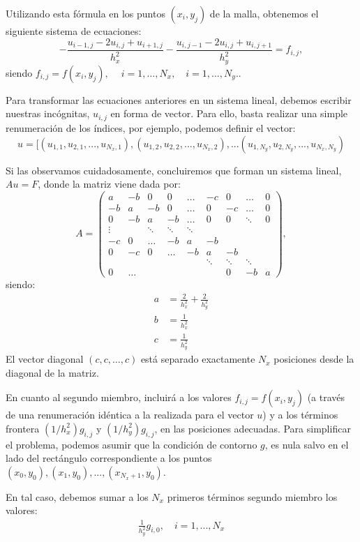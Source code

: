 \documentclass[11pt,spanish,a4wide]{article}
\begin{document}
Utilizando esta fórmula en los puntos $(x_i,y_j)$ de la malla,
obtenemos el siguiente sistema de ecuaciones:
$$
-\frac{u_{i-1,j}-2u_{i,j} + u_{i+1,j}}{h_x^2}
-\frac{u_{i,j-1}-2u_{i,j} + u_{i,j+1}}{h_y^2}
= f_{i,j},
$$
siendo $f_{i,j}=f(x_{i},y_j), \  \quad i=1,\dots,N_x,  \quad i=1,\dots,N_y.$.

Para transformar las ecuaciones anteriores en un sistema lineal,
debemos escribir nuestras incógnitas, $u_{i,j}$ en forma de
vector. Para ello, basta realizar una simple renumeración de los
índices, por ejemplo, podemos definir el vector:
$$
u=[(u_{1,1}, u_{2,1},...,u_{N_x,1}), (u_{1,2}, u_{2,2},...,u_{N_x,2}),
...
(u_{1,N_y}, u_{2,N_y},...,u_{N_x,N_y})
$$


Si las observamos cuidadosamente, concluiremos que forman un sistema
lineal, $Au=F$, donde la matriz viene dada por:
$$
A=
\begin{pmatrix}
   a & -b &  0 &  0 & \dots & -c & 0 & \dots & 0 \\
  -b &  a & -b &  0 & \dots & 0 & -c & \dots & 0\\
   0 & -b &  a & -b & \dots & 0 & 0 & \ddots & 0 \\
   \vdots &    & \ddots & \ddots & \ddots & \\
   -c & 0 & \dots & -b & a  & -b \\
   0 & -c &  0 & \dots & -b & a  & -b \\
     & & &&    & \ddots & \ddots & \ddots & \\
   0 & \dots & &  & & & 0 & -b & a
 \end{pmatrix},
$$
siendo:
\begin{align*}
  a&=\frac{2}{h_x^2}+\frac{2}{h_y^2} \\
  b&=\frac{1}{h_x^2} \\
  c&=\frac{1}{h_y^2}
\end{align*}
El vector diagonal $(c,c,\dots,c)$ está separado exactamente $N_x$
posiciones desde la diagonal de la matriz.

En cuanto al segundo miembro, incluirá a los valores
$f_{i,j}=f(x_i,y_j)$ (a través de una renumeración idéntica a la
realizada para el vector $u$) y a los términos frontera
$(1/h_x^2)g_{i,j}$ y $(1/h_y^2)g_{i,j}$, en las posiciones adecuadas.
Para simplificar el problema, podemos asumir que la condición de
contorno $g$, es nula salvo en el lado del rectángulo correspondiente
a los puntos $(x_0,y_0), (x_1,y_0),...,(x_{N_x+1},y_0)$.

En tal caso, debemos sumar a los $N_x$ primeros términos segundo
miembro los valores:
\begin{align*}
  \frac{1}{h_y^2} g_{i,0}, \quad i=1,...,N_x
\end{align*}
\end{document}
